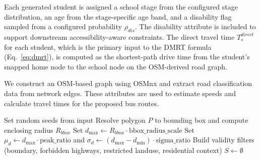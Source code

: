 \documentclass[journal]{IEEEtran}
\begin{document}
Each generated student is assigned a school stage from the 
configured stage distribution, an age from the stage-specific age 
band, and a disability flag sampled from a configured probability 
$\rho_{dis}$. The disability attribute is included to support 
downstream accessibility-aware constraints. The direct travel time 
$T^{direct}_s$ for each student, which is the primary input to the 
DMRT formula (Eq.~\ref{eq:dmrt}), is computed as the 
shortest-path drive time from the student's snapped home node to 
the school node on the OSM-derived road graph.

We construct an OSM-based graph using OSMnx
and extract road classification data from network edges. These 
attributes are used to estimate speeds and calculate travel times 
for the proposed bus routes.

\begin{algorithm}[!t]
\caption{Annulus-Based Synthetic Student Dataset Generation}
\label{alg:synthetic_data_gen}
Set random seeds from input\;
Resolve polygon $P$ to bounding box and compute enclosing radius 
$R_{bbox}$\;
Set $d_{\max}\leftarrow R_{bbox}\cdot\text{bbox\_radius\_scale}$\;
Set $\mu_d\leftarrow d_{\max}\cdot\text{peak\_ratio}$ and 
$\sigma_d\leftarrow(d_{\max}-d_{\min})\cdot\text{sigma\_ratio}$\;
Build validity filters (boundary, forbidden highways, restricted 
landuse, residential context)\;
$S\leftarrow\emptyset$\;
\;
\end{algorithm}
\end{document}

